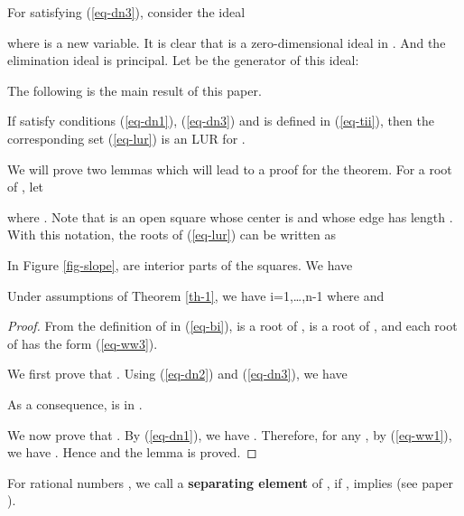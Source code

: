 \documentclass[amsthm]{JSC_LaTex_2007_Mar_12/elsart}
\def\bref#1{(\ref{#1})}
\begin{document}
For  satisfying \bref{eq-dn3}, consider the ideal

 where  is a new variable.
It is clear that  is a zero-dimensional ideal in
. And the elimination ideal
 is principal. Let  be the generator of this
ideal:

The following is the main result of this paper.
\begin{thm}\label{th-1}
If  satisfy conditions \bref{eq-dn1}, \bref{eq-dn3} and
 is defined in \bref{eq-tii}, then the corresponding set
\bref{eq-lur} is an LUR for .
\end{thm}

We will prove two lemmas which will lead to a proof for the theorem.
For a root  of , let

where .
Note that  is an open square whose center is
 and whose edge has length .
With this notation, the {roots} of \bref{eq-lur} can be written as

In Figure \ref{fig-slope},  are interior
parts of the squares.
We have
\begin{lem}\label{lm-ww0}
Under assumptions of Theorem \ref{th-1}, we have
i=1,\ldots,n-1 where   and

\end{lem}
\begin{proof}
From the definition of  in \bref{eq-bi},  is
a root of ,  is a root of , and
each root of  has the form \bref{eq-ww3}.

We first prove that  .
Using \bref{eq-dn2} and \bref{eq-dn3}, we have

As a consequence,  is in .

We now prove that . By \bref{eq-dn1}, we have . Therefore, for any , by \bref{eq-ww1}, we have . Hence 
and the lemma is proved.
\end{proof}



For rational numbers , we call  a
{\bf separating element} of , if ,   implies  (see paper \cite{rur}).
\end{document}
